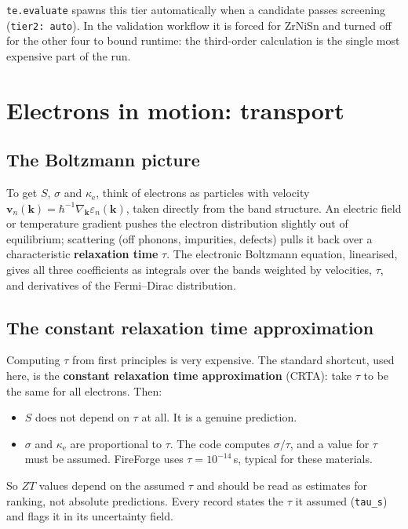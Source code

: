 \documentclass[11pt,a4paper]{report}
\newcommand{\code}[1]{\texttt{#1}}
\newcommand{\ke}{\kappa_\mathrm{e}}
\begin{document}
\begin{inff}
\code{te.evaluate} spawns this tier automatically when a candidate passes screening
(\code{tier2: auto}). In the validation workflow it is forced for ZrNiSn and turned off for the
other four to bound runtime: the third-order calculation is the single most expensive part of
the run.
\end{inff}

\chapter{Electrons in motion: transport}
\label{ch:transport}

\section{The Boltzmann picture}

To get $S$, $\sigma$ and $\ke$, think of electrons as particles with velocity
$\mathbf v_n(\mathbf k)=\hbar^{-1}\nabla_{\mathbf k}\varepsilon_n(\mathbf k)$, taken directly from the
band structure. An electric field or temperature gradient pushes the electron distribution
slightly out of equilibrium; scattering (off phonons, impurities, defects) pulls it back over a
characteristic \textbf{relaxation time} $\tau$. The electronic Boltzmann equation, linearised,
gives all three coefficients as integrals over the bands weighted by velocities, $\tau$, and
derivatives of the Fermi--Dirac distribution.

\section{The constant relaxation time approximation}

Computing $\tau$ from first principles is very expensive. The standard shortcut, used here, is
the \textbf{constant relaxation time approximation} (CRTA): take $\tau$ to be the same for all
electrons. Then:
\begin{itemize}
\item $S$ does not depend on $\tau$ at all. It is a genuine prediction.
\item $\sigma$ and $\ke$ are proportional to $\tau$. The code computes $\sigma/\tau$, and a value
  for $\tau$ must be assumed. FireForge uses $\tau=10^{-14}$\,s, typical for these materials.
\end{itemize}
So $ZT$ values depend on the assumed $\tau$ and should be read as estimates for ranking, not
absolute predictions. Every record states the $\tau$ it assumed (\code{tau\_s}) and flags it
in its uncertainty field.
\end{document}
